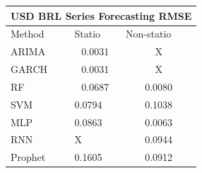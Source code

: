 \documentclass[10pt,twocolumn,letterpaper]{article}
\begin{document}
	\begin{table}[h]
		\label{table:usdbrlforecastRMSE}
		\centering
		\begin{tabular}{|lll|}
			\hline
			\multicolumn{3}{|c|}{USD BRL Series Forecasting RMSE}                                                  \\ \hline
			\multicolumn{1}{|l|}{Method}  & \multicolumn{1}{l|}{Statio} & Non-statio             \\ \hline
			\multicolumn{1}{|l|}{ARIMA}   & \multicolumn{1}{c|}{0.0031}       & \multicolumn{1}{c|}{X} \\ \hline
			\multicolumn{1}{|l|}{GARCH}   & \multicolumn{1}{c|}{0.0031}       & \multicolumn{1}{c|}{X} \\ \hline
			\multicolumn{1}{|l|}{RF}      & \multicolumn{1}{c|}{0.0687}       & \multicolumn{1}{c|}{0.0080}  \\ \hline
			\multicolumn{1}{|l|}{SVM}     & \multicolumn{1}{l|}{0.0794}       & \multicolumn{1}{c|}{0.1038}  \\ \hline
			\multicolumn{1}{|l|}{MLP}     & \multicolumn{1}{l|}{0.0863}       & \multicolumn{1}{c|}{0.0063}  \\ \hline
			\multicolumn{1}{|l|}{RNN}     & \multicolumn{1}{l|}{X}       & \multicolumn{1}{c|}{0.0944}  \\ \hline
			\multicolumn{1}{|l|}{Prophet} & \multicolumn{1}{l|}{0.1605}       & \multicolumn{1}{c|}{0.0912}  \\ \hline
		\end{tabular}
	\end{table}
	
\end{document}
